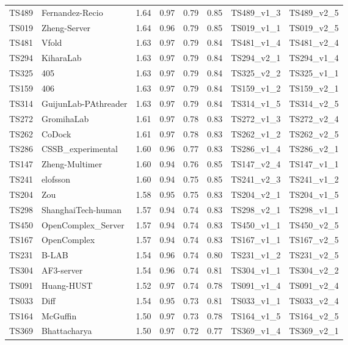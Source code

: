\begin{longtable}{llllllll}
TS489 & Fernandez-Recio & 1.64 & 0.97 & 0.79 & 0.85 & TS489\_v1\_3 & TS489\_v2\_5 \\ 
TS019 & Zheng-Server & 1.64 & 0.96 & 0.79 & 0.85 & TS019\_v1\_1 & TS019\_v2\_5 \\ 
TS481 & Vfold & 1.63 & 0.97 & 0.79 & 0.84 & TS481\_v1\_4 & TS481\_v2\_4 \\ 
TS294 & KiharaLab & 1.63 & 0.97 & 0.79 & 0.84 & TS294\_v2\_1 & TS294\_v1\_4 \\ 
TS325 & 405 & 1.63 & 0.97 & 0.79 & 0.84 & TS325\_v2\_2 & TS325\_v1\_1 \\ 
TS159 & 406 & 1.63 & 0.97 & 0.79 & 0.84 & TS159\_v1\_2 & TS159\_v2\_1 \\ 
TS314 & GuijunLab-PAthreader & 1.63 & 0.97 & 0.79 & 0.84 & TS314\_v1\_5 & TS314\_v2\_5 \\ 
TS272 & GromihaLab & 1.61 & 0.97 & 0.78 & 0.83 & TS272\_v1\_3 & TS272\_v2\_4 \\ 
TS262 & CoDock & 1.61 & 0.97 & 0.78 & 0.83 & TS262\_v1\_2 & TS262\_v2\_5 \\ 
TS286 & CSSB\_experimental & 1.60 & 0.96 & 0.77 & 0.83 & TS286\_v1\_4 & TS286\_v2\_1 \\ 
TS147 & Zheng-Multimer & 1.60 & 0.94 & 0.76 & 0.85 & TS147\_v2\_4 & TS147\_v1\_1 \\ 
TS241 & elofsson & 1.60 & 0.94 & 0.75 & 0.85 & TS241\_v2\_3 & TS241\_v1\_2 \\ 
TS204 & Zou & 1.58 & 0.95 & 0.75 & 0.83 & TS204\_v2\_1 & TS204\_v1\_5 \\ 
TS298 & ShanghaiTech-human & 1.57 & 0.94 & 0.74 & 0.83 & TS298\_v2\_1 & TS298\_v1\_1 \\ 
TS450 & OpenComplex\_Server & 1.57 & 0.94 & 0.74 & 0.83 & TS450\_v1\_1 & TS450\_v2\_5 \\ 
TS167 & OpenComplex & 1.57 & 0.94 & 0.74 & 0.83 & TS167\_v1\_1 & TS167\_v2\_5 \\ 
TS231 & B-LAB & 1.54 & 0.96 & 0.74 & 0.80 & TS231\_v1\_2 & TS231\_v2\_5 \\ 
TS304 & AF3-server & 1.54 & 0.96 & 0.74 & 0.81 & TS304\_v1\_1 & TS304\_v2\_2 \\ 
TS091 & Huang-HUST & 1.52 & 0.97 & 0.74 & 0.78 & TS091\_v1\_4 & TS091\_v2\_4 \\ 
TS033 & Diff & 1.54 & 0.95 & 0.73 & 0.81 & TS033\_v1\_1 & TS033\_v2\_4 \\ 
TS164 & McGuffin & 1.50 & 0.97 & 0.73 & 0.78 & TS164\_v1\_5 & TS164\_v2\_5 \\ 
TS369 & Bhattacharya & 1.50 & 0.97 & 0.72 & 0.77 & TS369\_v1\_4 & TS369\_v2\_1 \\ 

\end{longtable}
